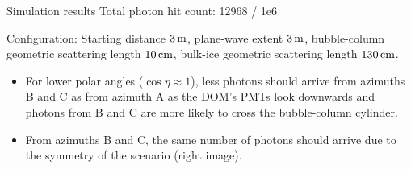 \begin{frame}[fragile]{Simulation results}
  \tiny Total photon hit count: 12968 / 1e6

  \tiny Configuration: Starting distance $3\text{\,m}$, plane-wave extent $3\text{\,m}$, bubble-column geometric scattering length $10\text{\,cm}$, bulk-ice geometric scattering length $130\text{\,cm}$.
  \normalsize

  \begin{itemize}
    \item For lower polar angles ($\cos\eta \approx 1$), less photons should arrive from azimuths B and C as from azimuth A
      \tiny as the DOM's PMTs look downwards and photons from B and C are more likely to cross the bubble-column cylinder. \normalsize
    \item From azimuths B and C, the same number of photons should arrive \tiny due to the symmetry of the scenario (right image). \normalsize
  \end{itemize}
\end{frame}

